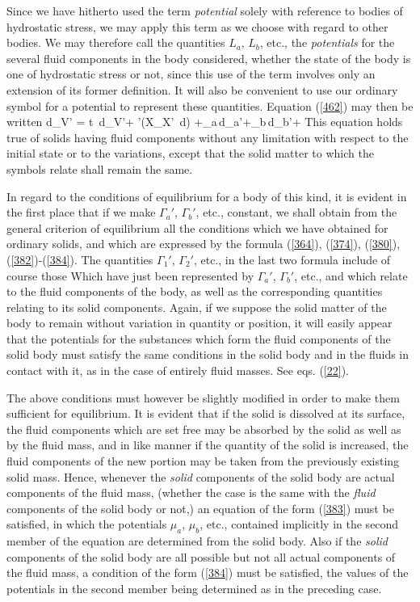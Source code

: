 \documentclass[12pt]{article}
\begin{document}
{Since we have hitherto used the term \textit{potential} solely with reference to bodies of hydrostatic stress, we may apply this term as we choose with regard to other bodies. We may therefore call the quantities $L_a$, $L_b$, etc., the \textit{potentials} for the several fluid components in the body considered, whether the state of the body is one of hydrostatic stress or not, since this use of the term involves only an extension of its former definition. It will also be convenient to use our ordinary symbol for a potential to represent these quantities. Equation (\ref{462}) may then be written
\eqs d\epsilon_{V'} = t \,d\eta_{V'}+  \sum\sum\nolimits'\left(X_{X'} \,d\right) +\mu_a\,d\Gamma_a'+\mu_b\,d\Gamma_b'+     \label{468}\eqe
This equation holds true of solids having fluid components without any limitation with respect to the initial state or to the variations, except that the solid matter to which the symbols relate shall remain the same.


In regard to the conditions of equilibrium for a body of this kind, it is evident in the first place that if we make $\Gamma_a'$, $\Gamma_b'$, etc., constant, we shall obtain from the general criterion of equilibrium all the conditions which we have obtained for ordinary solids, and which are expressed by the formula (\ref{364}), (\ref{374}), (\ref{380}), (\ref{382})-(\ref{384}). The quantities $\Gamma_1'$, $\Gamma_2'$, etc., in the last two formula include of course those Which have just been represented by $\Gamma_a'$, $\Gamma_b'$, etc., and which relate to the fluid components of the body, as well as the corresponding quantities relating to its solid components. Again, if we suppose the solid matter of the body to remain without variation in quantity or position, it will easily appear that the potentials for the substances which form the fluid components of the solid body must satisfy the same conditions in the solid body and in the fluids in contact with it, as in the case of entirely fluid masses. See eqs. (\ref{22}).


The above conditions must however be slightly modified in order to make them sufficient for equilibrium. It is evident that if the solid is dissolved at its surface, the fluid components which are set free may be absorbed by the solid as well as by the fluid mass, and in like manner if the quantity of the solid is increased, the fluid components of the new portion may be taken from the previously existing solid mass. Hence, whenever the \textit{solid} components of the solid body are actual components of the fluid mass, (whether the case is the same with the \textit{fluid} components of the solid body or not,) an equation of the form (\ref{383}) must be satisfied, in which the potentials $\mu_a$, $\mu_b$, etc., contained implicitly in the second member of the equation are determined from the solid body. Also if the \textit{solid} components of the solid body are all possible but not all actual components of the fluid mass, a condition of the form (\ref{384}) must be satisfied, the values of the potentials in the second member being determined as in the preceding case.


}
\end{document}
